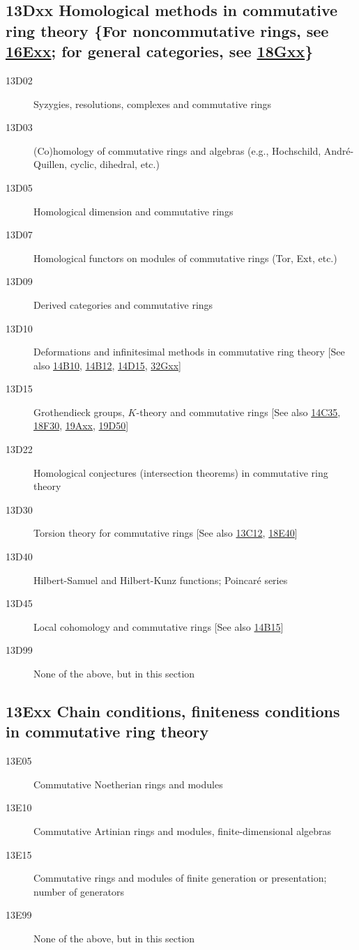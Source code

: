 \subsection*{13Dxx Homological methods in commutative ring theory \{For noncommutative rings, see \hyperref[16Exx]{16Exx}; for general categories, see \hyperref[18Gxx]{18Gxx}\} }\label{13Dxx}
\begin{description}               
\item [13D02]\label{13D02} Syzygies, resolutions, complexes and commutative rings
\item [13D03]\label{13D03} (Co)homology of commutative rings and algebras (e.g., Hochschild, Andr\'{e}-Quillen, cyclic, dihedral, etc.)
\item [13D05]\label{13D05} Homological dimension and commutative rings
\item [13D07]\label{13D07} Homological functors on modules of commutative rings (Tor, Ext, etc.)
\item [13D09]\label{13D09} Derived categories and commutative rings
\item [13D10]\label{13D10} Deformations and infinitesimal methods in commutative ring theory [See also \hyperref[14B10]{14B10}, \hyperref[14B12]{14B12}, \hyperref[14D15]{14D15}, \hyperref[32Gxx]{32Gxx}]
\item [13D15]\label{13D15} Grothendieck groups, $K$-theory and commutative rings [See also \hyperref[14C35]{14C35}, \hyperref[18F30]{18F30}, \hyperref[19Axx]{19Axx}, \hyperref[19D50]{19D50}]
\item [13D22]\label{13D22} Homological conjectures (intersection theorems) in commutative ring theory
\item [13D30]\label{13D30} Torsion theory for commutative rings [See also \hyperref[13C12]{13C12}, \hyperref[18E40]{18E40}]
\item [13D40]\label{13D40} Hilbert-Samuel and Hilbert-Kunz functions; Poincar\'{e} series
\item [13D45]\label{13D45} Local cohomology and commutative rings [See also \hyperref[14B15]{14B15}]
\item [13D99]\label{13D99} None of the above, but in this section
\end{description}          
\subsection*{13Exx Chain conditions, finiteness conditions in commutative ring theory}\label{13Exx}
\begin{description}
\item [13E05]\label{13E05} Commutative Noetherian rings and modules
\item [13E10]\label{13E10} Commutative Artinian rings and modules, finite-dimensional algebras
\item [13E15]\label{13E15} Commutative rings and modules of finite generation or presentation; number of generators
\item [13E99]\label{13E99} None of the above, but in this section
\end{description}          
